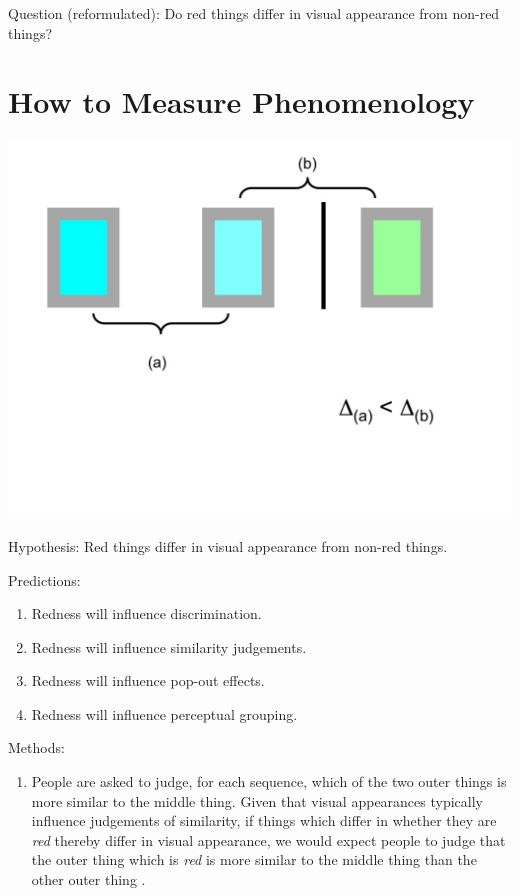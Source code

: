 \documentclass[12pt]{extarticle}
\begin{document}
\begin{multicols*}{3}
Question (reformulated):
Do red things differ in visual appearance from non-red things?




\section{How to Measure Phenomenology}

\begin{center}
\includegraphics[scale=0.25]{img/categorical_colour_difference3.jpg}
\end{center}

Hypothesis: Red things differ in visual appearance from non-red things.

Predictions:
\begin{enumerate}
\item Redness will influence discrimination.
\item Redness will influence similarity judgements.
\item Redness will influence pop-out effects.
\item Redness will influence perceptual grouping.
\end{enumerate}

Methods:
\begin{enumerate}

\item People are asked to judge, for each sequence, which of the two outer
things is more similar to the middle thing. Given that visual appearances typically influence
judgements of similarity, if things which differ in whether they are
\emph{red} thereby differ in visual appearance, we would expect people to
judge that the outer thing which is \emph{red} is more similar to the
middle thing than the other outer thing
\citep{kay_what_1984,witzel2014category}.


\end{enumerate}
\end{multicols*}
\end{document}
